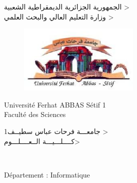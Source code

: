 \begin{titlepage}
\begin{center}


\vspace*{-0.1\textheight}



\<    الجمهورية الجزائرية الديمقراطية الشعبية >\\

\<  وزارة التعليم العالي والبحث العلمي >
\\[1cm]


\begin{figure}[h]
    \centering
    \includegraphics[width=0.3\linewidth]{univfrhat.PNG}
    
\end{figure}






\begin{minipage}[t]{0.6\textwidth}
\begin{flushleft} \large
\vspace*{-0.2\textheight}
\hspace*{-0.02\textheight}
{Université Ferhat ABBAS  Sétif 1}\\
\hspace*{-0.02\textheight}
{ Faculté des Sciences }
\end{flushleft}
\end{minipage}
\begin{minipage}[t]{0.3\textwidth}
\begin{flushright} \large
\vspace*{-0.225\textheight}  %
\hspace*{-0.06\textheight}
{1\<جامعـــة فرحات عباس	سطيــف    >} \\
\hspace*{0.01\textheight}
{  \<    كــــلـــيـــة الــعــــلـــوم>        
}


\end{flushright}
\end{minipage}\\%


\begin{minipage}[t]{0.6\textwidth}
\begin{flushleft} \large
\vspace*{-0.05\textheight}
\hspace*{-0.12\textheight}
{Département : }
{Informatique}
\end{flushleft}
\end{minipage}


\end{center}
\end{titlepage}
